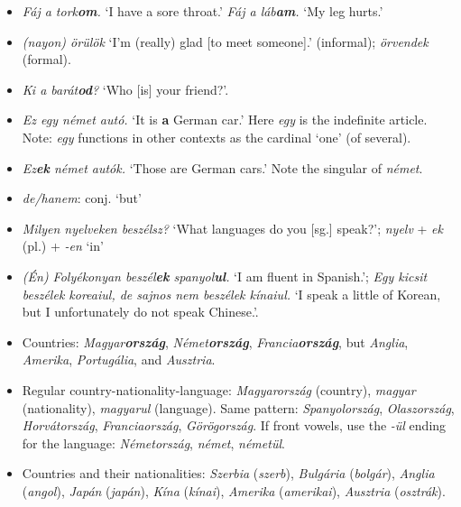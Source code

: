 \documentclass[a4paper,11pt]{article}
\begin{document}
\begin{itemize}
  \item \emph{Fáj a tork\textbf{om}.} `I have a sore throat.'
    \emph{Fáj a láb\textbf{am}.} `My leg hurts.'

  \item \emph{(nayon) örülök} `I'm (really) glad [to meet someone].'
    (informal); \emph{örvendek} (formal).

  \item \emph{Ki a barát\textbf{od}?} `Who [is] your friend?'.

  \item \emph{Ez egy német autó.} `It is \textbf{a} German car.' Here
    \emph{egy} is the indefinite article. Note: \emph{egy} functions
    in other contexts as the cardinal `one' (of several).

  \item \emph{Ez\textbf{ek} német autók.} `Those are German cars.'
    Note the singular of \emph{német}.

  \item \emph{de/hanem}: conj. `but'

  \item \emph{Milyen nyelveken beszélsz?} `What languages do you
    [sg.] speak?'; \emph{nyelv} + \emph{ek} (pl.) + \emph{-en} `in'

  \item \emph{(Én) Folyékonyan beszél\textbf{ek} spanyol\textbf{ul}.}
    `I am fluent in Spanish.'; \emph{Egy kicsit beszélek koreaiul, de
  sajnos nem beszélek kínaiul.} `I speak a little of Korean, but I
    unfortunately do not speak Chinese.'.

  \item Countries: \emph{Magyar\textbf{ország}},
    \emph{Német\textbf{ország}}, \emph{Francia\textbf{ország}}, but
    \emph{Anglia}, \emph{A\-me\-ri\-ka}, \emph{Portugália}, and
    \emph{Ausztria}.

  \item Regular country\hyp{}nationality\hyp{}language:
    \emph{Magyarország} (country), \emph{magyar} (nationality),
    \emph{magyarul} (language). Same pattern: \emph{Spanyolország},
    \emph{Olaszország}, \emph{Horvátország}, \emph{Franciaország},
    \emph{Gö\-rög\-or\-szág}. If front vowels, use the \emph{-ül}
    ending for the language: \emph{Németország}, \emph{német},
    \emph{németül}.

  \item Countries and their nationalities: \emph{Szerbia}
    (\emph{szerb}), \emph{Bulgária} (\emph{bolgár}), \emph{Anglia}
    (\emph{angol}), \emph{Japán} (\emph{japán}), \emph{Kína}
    (\emph{kínai}), \emph{Amerika} (\emph{ameri\-kai}),
    \emph{Ausztria} (\emph{osztrák}).


\end{itemize}
\end{document}
